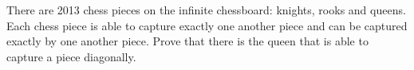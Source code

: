 \problem
There are 2013 chess pieces on the infinite chessboard: knights, rooks and
queens.
Each chess piece is able to capture exactly one another piece and can be
captured exactly by one another piece.
Prove that there is the queen that is able to capture a piece diagonally.

\solution

\endproblem
